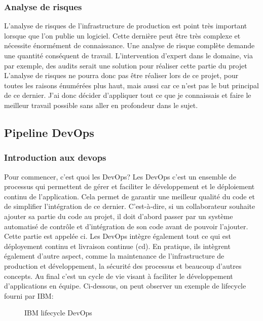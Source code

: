\documentclass[
    iai, %
    il, %
]{heig-tb}
\begin{document}
\subsubsection{Analyse de risques}

L'analyse de risques de l'infrastructure de production est point très important lorsque que l'on publie un logiciel. Cette dernière peut être très complexe et nécessite énormément de connaissance.
Une analyse de risque complète demande une quantité conséquent de travail. L'intervention d'expert dans le domaine, via par exemple, des audits serait une solution pour réaliser cette partie du projet
L'analyse de risques ne pourra donc pas être réaliser lors de ce projet, pour toutes les raisons énumérées plus haut, mais aussi car ce n'est pas le but principal de ce dernier.
J'ai donc décider d'appliquer tout ce que je connaissais et faire le meilleur travail possible sans aller en profondeur dans le sujet.


\clearpage
\subsection{Pipeline DevOps}
\subsubsection{Introduction aux \Gls{devops}}
Pour commencer, c'est quoi les DevOps?
Les DevOps c'est un ensemble de processus qui permettent de gérer et faciliter le développement et le déploiement continu de l'application. Cela permet de garantir une meilleur qualité du code et de simplifier l'intégration de ce dernier. C'est-à-dire, si un collaborateur souhaite ajouter sa partie du code au projet, il doit d'abord passer par un système automatisé de contrôle et d'intégration de son code avant de pouvoir l'ajouter. Cette partie est appelée \Gls{ci}.
Les DevOps intègre également tout ce qui est déployement continu et livraison continue (\Gls{cd}).
En pratique, ils intègrent également d'autre aspect, comme la maintenance de l'infrastructure de production et développement, la sécurité des processus et beaucoup d'autres concepts.
Au final c'est un cycle de vie visant à faciliter le développement d'applications en équipe.
Ci-dessous, on peut observer un exemple de lifecycle fourni par IBM:
\begin{figure}
    \caption{IBM lifecycle DevOps}
\end{figure}
\end{document}
